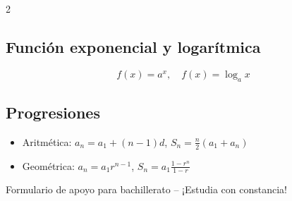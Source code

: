 \documentclass[12pt]{article}
\begin{document}
\begin{multicols}{2}
\subsection*{Función exponencial y logarítmica}
\[
f(x)=a^x,\quad f(x)=\log_a x
\]

\subsection*{Progresiones}
\begin{itemize}[leftmargin=*]
    \item Aritmética: $a_n = a_1 + (n-1)d$, \quad $S_n = \frac{n}{2}(a_1+a_n)$
    \item Geométrica: $a_n = a_1 r^{n-1}$, \quad $S_n = a_1\frac{1-r^n}{1-r}$
\end{itemize}

\end{multicols}

\vfill
\begin{center}
\small{Formulario de apoyo para bachillerato -- ¡Estudia con constancia!}
\end{center}
\end{document}
